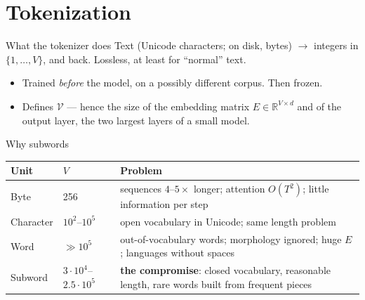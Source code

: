 \documentclass[11pt,aspectratio=169]{beamer}
\newcommand{\V}{\mathcal{V}}
\newcommand{\dest}[1]{\textcolor{structure}{\textbf{#1}}}
\begin{document}
\section{Tokenization}

\begin{frame}{What the tokenizer does}
  Text (Unicode characters; on disk, bytes) $\longrightarrow$ integers in $\{1,\dots,V\}$,
  and back. Lossless, at least for ``normal'' text.

  \vspace{1em}
  \begin{itemize}
    \item Trained \emph{before} the model, on a possibly different corpus. Then frozen.
    \item Defines $\V$ --- hence the size of the embedding matrix $E\in\mathbb{R}^{V\times d}$
          and of the output layer, the two largest layers of a small model.
  \end{itemize}
\end{frame}

\begin{frame}{Why subwords}
  \begin{center}
  \begin{tabular}{@{}llp{7.5cm}@{}}
    \toprule
    \textbf{Unit} & $V$ & \textbf{Problem} \\
    \midrule
    Byte & 256 & sequences $4$--$5\times$ longer; attention $O(T^2)$; little information per step \\
    Character & $10^2$--$10^5$ & open vocabulary in Unicode; same length problem \\
    Word & $\gg 10^5$ & out-of-vocabulary words; morphology ignored; huge $E$; languages without spaces \\
    Subword & $3\cdot 10^4$--$2.5\cdot 10^5$ & \dest{the compromise}: closed vocabulary, reasonable length, rare words built from frequent pieces \\
    \bottomrule
  \end{tabular}
  \end{center}
\end{frame}
\end{document}
